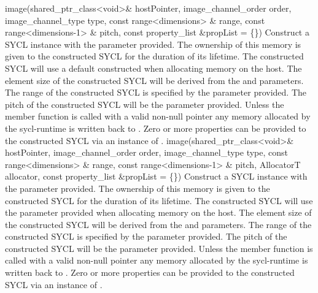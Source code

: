   \addRowSixSL
    {image(shared_ptr_class<void>\& hostPointer, }
    { image_channel_order order, }
    { image_channel_type type, }
    { const range<dimensions> \& range, }
    { const range<dimensions-1> \& pitch, }
    { const property_list \&propList = \{\}) }
    {
         Construct a SYCL  instance with the  parameter provided. The ownership of this memory is given to the constructed SYCL  for the duration of its lifetime.
         The constructed SYCL  will use a default constructed  when allocating memory on the host.
         The element size of the constructed SYCL  will be derived from the  and  parameters.
         The range of the constructed SYCL  is specified by the  parameter provided.
         The pitch of the constructed SYCL  will be the  parameter provided.
         Unless the member function  is called with a valid non-null pointer any memory allocated by the \gls{sycl-runtime} is written back to .
         Zero or more properties can be provided to the constructed SYCL  via an instance of .
    }
  \addRowSevenSL
    {image(shared_ptr_class<void>\& hostPointer, }
    { image_channel_order order, }
    { image_channel_type type, }
    { const range<dimensions> \& range, }
    { const range<dimensions-1> \& pitch, }
    { AllocatorT allocator, }
    { const property_list \&propList = \{\}) }
    {
         Construct a SYCL  instance with the  parameter provided. The ownership of this memory is given to the constructed SYCL  for the duration of its lifetime.
         The constructed SYCL  will use the  parameter provided when allocating memory on the host.
         The element size of the constructed SYCL  will be derived from the  and  parameters.
         The range of the constructed SYCL  is specified by the  parameter provided.
         The pitch of the constructed SYCL  will be the  parameter provided.
         Unless the member function  is called with a valid non-null pointer any memory allocated by the \gls{sycl-runtime} is written back to .
         Zero or more properties can be provided to the constructed SYCL  via an instance of .
    }
